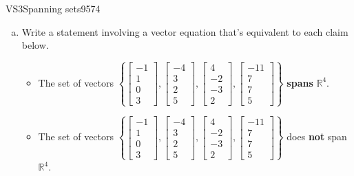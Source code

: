\begin{exercise}{VS3}{Spanning sets}{9574} 
\begin{exerciseStatement} 

\begin{enumerate}[(a)]
\item  

 Write a statement involving a vector equation that's equivalent to each claim below. 

 

\begin{itemize}
\item  

 The set of vectors \(\left\{ \left[\begin{array}{c}
-1 \\
1 \\
0 \\
3
\end{array}\right] , \left[\begin{array}{c}
-4 \\
3 \\
2 \\
5
\end{array}\right] , \left[\begin{array}{c}
4 \\
-2 \\
-3 \\
2
\end{array}\right] , \left[\begin{array}{c}
-11 \\
7 \\
7 \\
5
\end{array}\right] \right\}\) \textbf{spans} \(\mathbb R^4\). 

 
\item  

 The set of vectors \(\left\{ \left[\begin{array}{c}
-1 \\
1 \\
0 \\
3
\end{array}\right] , \left[\begin{array}{c}
-4 \\
3 \\
2 \\
5
\end{array}\right] , \left[\begin{array}{c}
4 \\
-2 \\
-3 \\
2
\end{array}\right] , \left[\begin{array}{c}
-11 \\
7 \\
7 \\
5
\end{array}\right] \right\}\) does \textbf{not} span \(\mathbb R^4\). 


\end{itemize}
\end{enumerate}
\end{exerciseStatement}
\end{exercise}
